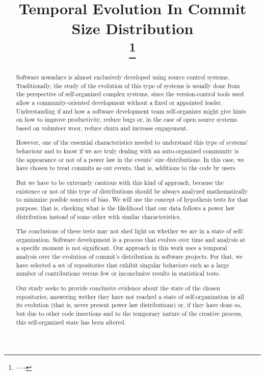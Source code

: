 \documentclass[conference]{IEEEtran}
\begin{document}
\title{Temporal Evolution In Commit Size Distribution\\
  \thanks{----} }

\author{\IEEEauthorblockN{-} \IEEEauthorblockA{-} \and
  \IEEEauthorblockN{-} \IEEEauthorblockA{-} }

\maketitle

\begin{abstract}
  Software nowadays is almost exclusively developed using source
  control systems. Traditionally, the study of the evolution of this
  type of systems is usually done from the perspective of
  self-organized complex systems, since the version-control tools used
  allow a community-oriented development without a fixed or appointed
  leader. Understanding if and how a software development team
  self-organizes might give hints on how to improve productivity,
  reduce bugs or, in the case of open source systems based on
  volunteer woor, reduce churn and increase engagement.

  However, one of the essential characteristics needed to understand
  this type of systems' behaviour and to know if we are truly dealing
  with an auto-organized community is the appearance or not of a power
  law in the events' size distributions.  In this case, we have chosen
  to treat commits as our events, that is, additions to the code by
  users.

  But we have to be extremely cautious with this kind of approach,
  because the existence or not of this type of distributions should be
  always analyzed mathematically to minimize posible sources of bias.
  We will use the concept of hypothesis tests for that purpose, that
  is, checking what is the likelihood that our data follows a power
  law distribution instead of some other with similar characteristics.

  The conclusions of these tests may not shed light on whether we are
  in a state of self-organization.  Software development is a process
  that evolves over time and analysis at a specific moment is not
  significant.  Our approach in this work uses a temporal analysis
  over the evolution of commit's distribution in software
  projects. For that, we have selected a set of repositories that
  exhibit singular behaviors such as a large number of contributions
  versus few or inconclusive results in statistical tests.

  Our study seeks to provide conclusive evidence about the state of
  the chosen repositories, answering wether they have not reached a
  state of self-organization in all its evolution (that is, never
  present power law distributions) or, if they have done so, but due
  to other code insertions and to the temporary nature of the creative
  process, this self-organized state has been altered.

  

\end{abstract}
\end{document}

